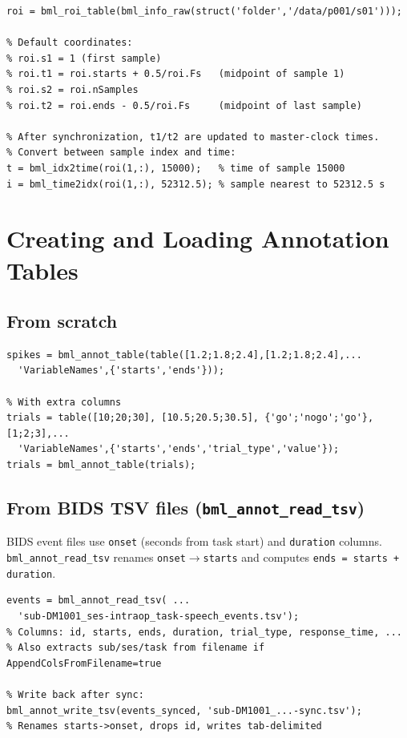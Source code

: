 \documentclass[11pt, a4paper]{article}
\begin{document}
\begin{lstlisting}[style=matlab, caption={Building and using an ROI table}]
% Build from file scan
roi = bml_roi_table(bml_info_raw(struct('folder','/data/p001/s01')));

% Default coordinates:
% roi.s1 = 1 (first sample)
% roi.t1 = roi.starts + 0.5/roi.Fs   (midpoint of sample 1)
% roi.s2 = roi.nSamples
% roi.t2 = roi.ends - 0.5/roi.Fs     (midpoint of last sample)

% After synchronization, t1/t2 are updated to master-clock times.
% Convert between sample index and time:
t = bml_idx2time(roi(1,:), 15000);   % time of sample 15000
i = bml_time2idx(roi(1,:), 52312.5); % sample nearest to 52312.5 s
\end{lstlisting}

\section{Creating and Loading Annotation Tables}
\label{sec:io}

\subsection{From scratch}

\begin{lstlisting}[style=matlab]
% Minimal: just starts and ends
spikes = bml_annot_table(table([1.2;1.8;2.4],[1.2;1.8;2.4],...
  'VariableNames',{'starts','ends'}));

% With extra columns
trials = table([10;20;30], [10.5;20.5;30.5], {'go';'nogo';'go'}, [1;2;3],...
  'VariableNames',{'starts','ends','trial_type','value'});
trials = bml_annot_table(trials);
\end{lstlisting}

\subsection{From BIDS TSV files (\texttt{bml\_annot\_read\_tsv})}

BIDS event files use \texttt{onset} (seconds from task start) and \texttt{duration} columns. \texttt{bml\_annot\_read\_tsv} renames \texttt{onset}$\to$\texttt{starts} and computes \texttt{ends = starts + duration}.

\begin{lstlisting}[style=matlab]
events = bml_annot_read_tsv( ...
  'sub-DM1001_ses-intraop_task-speech_events.tsv');
% Columns: id, starts, ends, duration, trial_type, response_time, ...
% Also extracts sub/ses/task from filename if AppendColsFromFilename=true

% Write back after sync:
bml_annot_write_tsv(events_synced, 'sub-DM1001_...-sync.tsv');
% Renames starts->onset, drops id, writes tab-delimited
\end{lstlisting}
\end{document}
